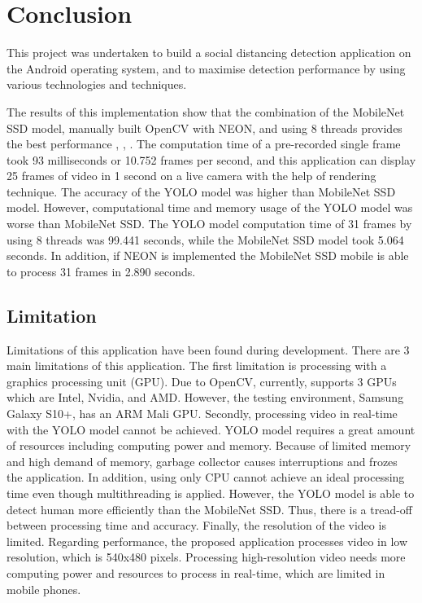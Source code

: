 \chapter{Conclusion}\label{conclusion}

    This project was undertaken to build a social distancing detection application on the Android operating system,
    and to maximise detection performance by using various technologies and techniques.

    The results of this implementation show that the combination of the MobileNet SSD model,
    manually built OpenCV with NEON, and using 8 threads provides the best performance \cite{tensorflow2015-whitepaper}, \cite{opencv_library}, \cite{NEON-ARM}.
    The computation time of a pre-recorded single frame took 93 milliseconds or 10.752 frames per second,
    and this application can display 25 frames of video in 1 second on a live camera
    with the help of rendering technique.
    The accuracy of the YOLO model was higher than MobileNet SSD model.
    However, computational time and memory usage of the YOLO model was worse than MobileNet SSD.
    The YOLO model computation time of 31 frames by using 8 threads was 99.441 seconds,
    while the MobileNet SSD model took 5.064 seconds.
    In addition, if NEON is implemented the MobileNet SSD mobile is able to process 31 frames in 2.890 seconds.

    \section{Limitation}
        Limitations of this application have been found during development.
        There are 3 main limitations of this application.
        The first limitation is processing with a graphics processing unit (GPU).
            Due to OpenCV, currently, supports 3 GPUs which are Intel, Nvidia, and AMD.
            However, the testing environment, Samsung Galaxy S10+, has an ARM Mali GPU.
        Secondly, processing video in real-time with the YOLO model cannot be achieved.
            YOLO model requires a great amount of resources including computing power and memory.
            Because of limited memory and high demand of memory, garbage collector causes interruptions and frozes the application.
            In addition, using only CPU cannot achieve an ideal processing time even though multithreading is applied.
            However, the YOLO model is able to detect human more efficiently than the MobileNet SSD.
            Thus, there is a tread-off between processing time and accuracy.
            Finally, the resolution of the video is limited.
            Regarding performance, the proposed application processes video in low resolution,
            which is 540x480 pixels.
            Processing high-resolution video needs more computing power and resources to process in real-time,
            which are limited in mobile phones.


